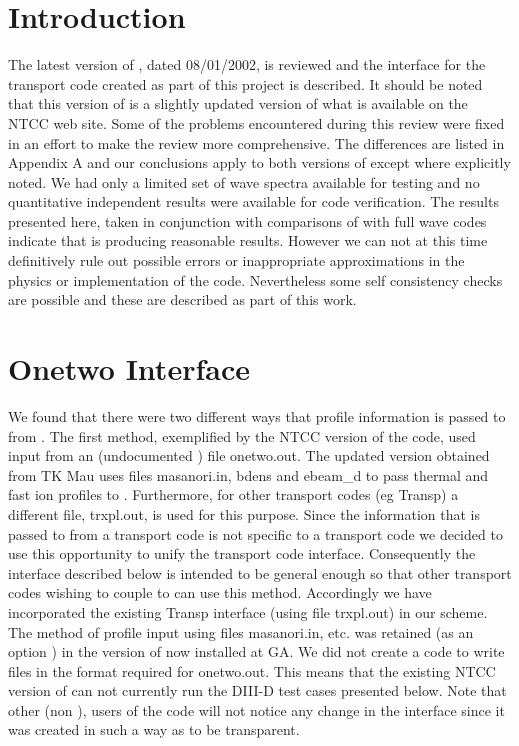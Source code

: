 \section{Introduction} \label{intro}
  The latest version of \ct, dated  08/01/2002,
  is reviewed and the interface for the \ot transport
  code created as part of this project is described. It should be
  noted that this version of \ct  is a slightly updated version of what is
  available on the NTCC web site. Some of the problems encountered
  during  this review were fixed in an effort to make the review more
  comprehensive. The differences  are listed in 
  Appendix A  and our conclusions apply to both versions of \ct except
  where explicitly noted. We had only a limited set of wave spectra 
  available for testing  and no quantitative independent results were available for
  code verification. The results presented here, taken in conjunction
  with comparisons of \ct with full wave codes \cite{b1} indicate
  that \ct is producing reasonable results.  However we can not at this
  time definitively rule
  out possible errors or inappropriate approximations  in the physics
  or implementation of the code. Nevertheless some self consistency
  checks are possible and these are described as part of this work.



 \section{Onetwo Interface}\label{interface}
  We found that there were  two  different ways
that profile information is passed to \ct from \ot. The first method,
exemplified by the NTCC version of the code, used input from an
(undocumented )  file onetwo.out.  The updated version \ct obtained
from TK Mau uses files  masanori.in, bdens and ebeam\_d to pass thermal
and fast ion profiles to \ct. Furthermore, for other transport codes (eg
Transp) a different file, trxpl.out, is used for this purpose.
Since the information that is passed to \ct from a transport code is
not specific to a transport code we decided to use this opportunity
to unify the transport code interface. Consequently  the interface
described below is intended to be general enough so that other transport
codes wishing to couple to \ct can use this method. Accordingly we
have incorporated the existing Transp interface (using file trxpl.out)
in our scheme. The  method of profile input using files
masanori.in, etc.  was retained (as an option ) in the version of
\ct now installed at GA. We did not create a code to write files
in the format required for onetwo.out. This means that the existing
NTCC version of \ct can not currently run the DIII-D test cases
presented below. 
Note that other (non \ot), users  of the code will  not notice any change in
the interface  since it was created in such a way as to be 
transparent. 

